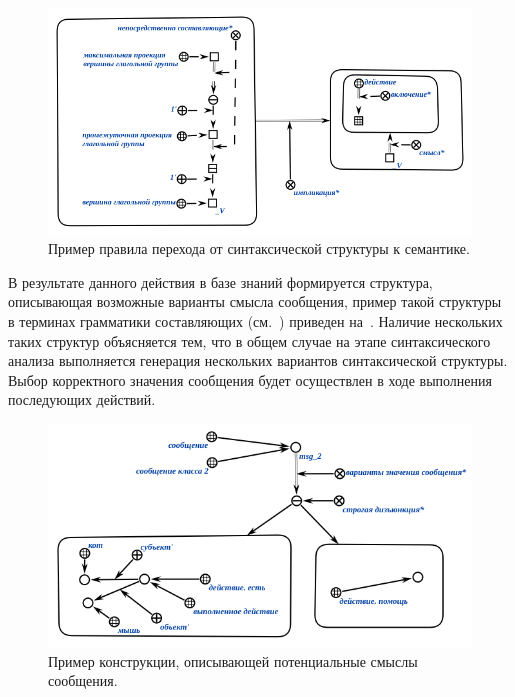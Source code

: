 \begin{figure}[h]
    \centering
    \includegraphics[scale=0.8]{images/part4/chapter_nl_interfaces/d_sem_3}
    \caption{Пример правила перехода от синтаксической структуры к семантике.}
    \label{fig:transition_to_semanic_rule}
\end{figure}

В результате данного действия в базе знаний формируется структура, описывающая возможные варианты смысла сообщения, пример такой структуры в терминах грамматики составляющих (см.~) приведен на~\textit{}.
Наличие нескольких таких структур объясняется тем, что в общем случае на этапе синтаксического анализа выполняется генерация нескольких вариантов синтаксической структуры.
Выбор корректного значения сообщения будет осуществлен в ходе выполнения последующих действий.

\begin{figure}[h]
    \centering
    \includegraphics[scale=0.8]{images/part4/chapter_nl_interfaces/messsage_meaning_variants}
    \caption{Пример конструкции, описывающей потенциальные смыслы сообщения.}
    \label{fig:messsage_meaning_variants}
\end{figure}

